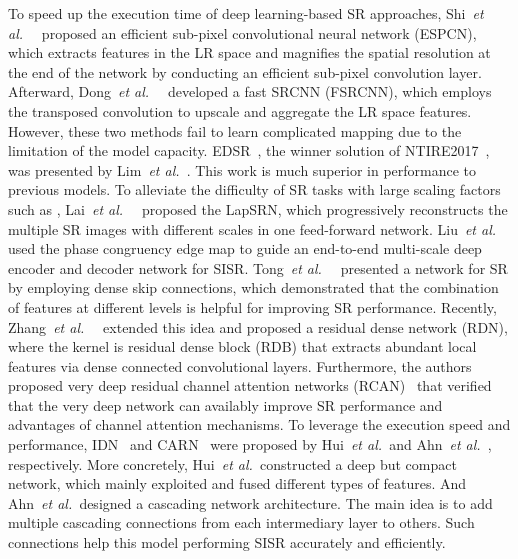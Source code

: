 \documentclass[preprint]{elsarticle}
\newcommand{\etal}{\textit{et al.~}}
\begin{document}
To speed up the execution time of deep learning-based SR approaches, Shi~\etal~\cite{ESPCN} proposed an efficient sub-pixel convolutional neural network (ESPCN), which extracts features in the LR space and magnifies the spatial resolution at the end of the network by conducting an efficient sub-pixel convolution layer. Afterward, Dong~\etal~\cite{FSRCNN} developed a fast SRCNN (FSRCNN), which employs the transposed convolution to upscale and aggregate the LR space features. However, these two methods fail to learn complicated mapping due to the limitation of the model capacity. EDSR~\cite{EDSR}, the winner solution of NTIRE2017~\cite{NTIRE2017}, was presented by Lim~\etal. This work is much superior in performance to previous models. To alleviate the difficulty of SR tasks with large scaling factors such as , Lai~\etal~\cite{LapSRN} proposed the LapSRN, which progressively reconstructs the multiple SR images with different scales in one feed-forward network. Liu~\etal~\cite{MSDEPC_IS19} used the phase congruency edge map to guide an end-to-end multi-scale deep encoder and decoder network for SISR. Tong~\etal~\cite{SRDenseNet} presented a network for SR by employing dense skip connections, which demonstrated that the combination of features at different levels is helpful for improving SR performance. Recently, Zhang~\etal~\cite{RDN} extended this idea and proposed a residual dense network (RDN), where the kernel is residual dense block (RDB) that extracts abundant local features via dense connected convolutional layers. Furthermore, the authors proposed very deep residual channel attention networks (RCAN)~\cite{RCAN} that verified that the very deep network can availably improve SR performance and advantages of channel attention mechanisms. To leverage the execution speed and performance, IDN~\cite{IDN} and CARN~\cite{CARN} were proposed by Hui~\etal and Ahn~\etal, respectively. More concretely, Hui~\etal constructed a deep but compact network, which mainly exploited and fused different types of features. And Ahn~\etal designed a cascading network architecture. The main idea is to add multiple cascading connections from each intermediary layer to others. Such connections help this model performing SISR accurately and efficiently.
\end{document}
